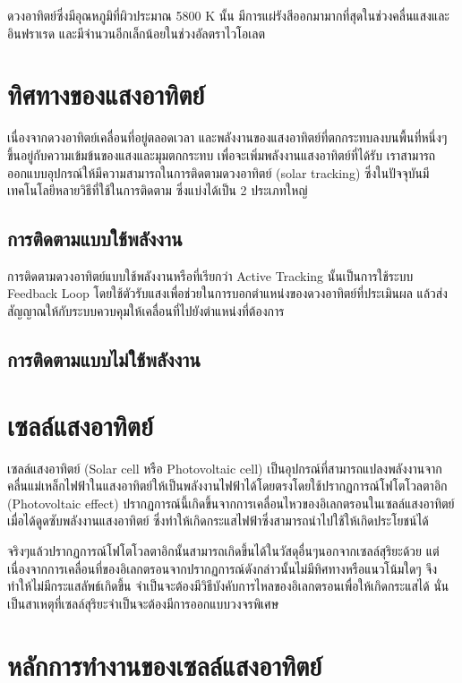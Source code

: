 \message{ !name(solar.tex)}\documentclass[
a4paper,
svgnames,
openany,
justified,
]{tufte-book}
\begin{document}
ดวงอาทิตย์ซึ่งมีอุณหภูมิที่ผิวประมาณ 5800 K นั้น มีการแผ่รังสีออกมามากที่สุดในช่วงคลื่นแสงและอินฟราเรด และมีจำนวนอีกเล็กน้อยในช่วงอัลตราไวโอเลต

\section{ทิศทางของแสงอาทิตย์}

เนื่องจากดวงอาทิตย์เคลื่อนที่อยู่ตลอดเวลา และพลังงานของแสงอาทิตย์ที่ตกกระทบลงบนพื้นที่หนึ่งๆขึ้นอยู่กับความเข้มข้นของแสงและมุมตกกระทบ เพื่อจะเพิ่มพลังงานแสงอาทิตย์ที่ได้รับ เราสามารถออกแบบอุปกรณ์ให้มีความสามารถในการติดตามดวงอาทิตย์ (solar tracking) ซึ่งในปัจจุบันมีเทคโนโลยีหลายวิธีที่ใช้ในการติดตาม ซึ่งแบ่งได้เป็น 2 ประเภทใหญ่

\subsection{การติดตามแบบใช้พลังงาน}

การติดตามดวงอาทิตย์แบบใช้พลังงานหรือที่เรียกว่า Active Tracking นั้นเป็นการใช้ระบบ Feedback Loop โดยใช้ตัวรับแสงเพื่อช่วยในการบอกตำแหน่งของดวงอาทิตย์ที่ประเมินผล แล้วส่งสัญญาณให้กับระบบควบคุมให้เคลื่อนที่ไปยังตำแหน่งที่ต้องการ

\subsection{การติดตามแบบไม่ใช้พลังงาน}

\section{เซลล์แสงอาทิตย์}

เซลล์แสงอาทิตย์ (Solar cell หรือ Photovoltaic cell) เป็นอุปกรณ์ที่สามารถแปลงพลังงานจากคลื่นแม่เหล็กไฟฟ้าในแสงอาทิตย์ให้เป็นพลังงานไฟฟ้าได้โดยตรงโดยใช้ปรากฏการณ์โฟโตโวลตาอิก (Photovoltaic effect) ปรากฏการณ์นี้เกิดขึ้นจากการเคลื่อนไหวของอิเลกตรอนในเซลล์แสงอาทิตย์เมื่อได้ดูดซับพลังงานแสงอาทิตย์ ซึ่งทำให้เกิดกระแสไฟฟ้าซึ่งสามารถนำไปใช้ให้เกิดประโยชน์ได้

จริงๆแล้วปรากฏการณ์โฟโตโวลตาอิกนั้นสามารถเกิดขึ้นได้ในวัสดุอื่นๆนอกจากเซลล์สุริยะด้วย แต่เนื่องจากการเคลื่อนที่ของอิเลกตรอนจากปรากฏการณ์ดังกล่าวนั้นไม่มีทิศทางหรือแนวโน้มใดๆ จึงทำให้ไม่มีกระแสลัพธ์เกิดขึ้น จำเป็นจะต้องมีวิธีบังคับการไหลของอิเลกตรอนเพื่อให้เกิดกระแสได้ นั่นเป็นสาเหตุที่เซลล์สุริยะจำเป็นจะต้องมีการออกแบบวงจรพิเศษ



\section{หลักการทำงานของเซลล์แสงอาทิตย์}
\end{document}
